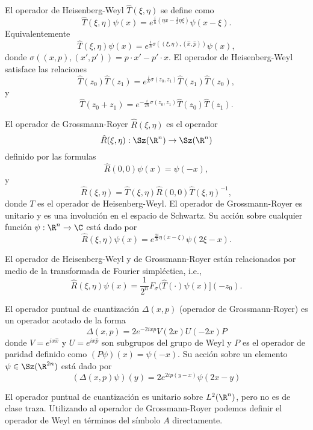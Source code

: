   \begin{definition}
    El operador de Heisenberg-Weyl $\hat{T}(\xi,\eta)$ se
    define como
    \[
      \hat{T}(\xi,\eta)\psi(x)
      = e^{\frac{i}{\hbar} (\eta x - \frac{1}{2} \eta
      \xi)}\psi(x - \xi).
    \] 
    Equivalentemente
    \[
      \hat{T}(\xi,\eta)\psi(x)
      = e^{\frac{i}{\hbar} \sigma((\xi,\eta),
      (\hat{x},\hat{p}))}\psi(x),
    \] 
    donde $\sigma((x,p),(x',p')) = p \cdot x' - p' \cdot x$.
    El operador de Heisenberg-Weyl satisface las relaciones
    \[
      \hat{T}(z_0)\hat{T}(z_1)
      = e^{\frac{i}{\hbar} \sigma(z_0,z_1)}
      \hat{T}(z_1)\hat{T}(z_0),
    \] 
    y
    \[
      \hat{T}(z_0+z_1)
      = e^{-\frac{i}{2\hbar} \sigma(z_0,z_1)}
      \hat{T}(z_0)\hat{T}(z_1).
    \] 
  \end{definition}
  \begin{definition}
    El operador de Grossmann-Royer $\hat{R}(\xi,\eta)$ es el
    operador
    \[
      \hat{R}(\xi,\eta) : \Sz(\R^{n}) \to \Sz(\R^{n})
    \] 
    definido por las formulas 
    \[
      \hat{R}(0,0)\psi(x)
      = \psi(-x),
    \]
    y
    \[
      \hat{R}(\xi,\eta)
      = \hat{T}(\xi,\eta) \hat{R}(0,0)
      \hat{T}(\xi,\eta)^{-1},
    \] 
    donde $T$ es el operador de Heisenberg-Weyl. El operador
    de Grossmann-Royer es unitario y es una involución en el
    espacio de Schwartz. Su acción sobre cualquier función
    $\psi : \R^{n} \to \C$ está dado por
    \[
      \hat{R}(\xi,\eta)\psi(x)
      = e^{\frac{2i}{\hbar} \eta (x - \xi)}\psi(2\xi - x).
    \] 
  \end{definition}
  El operador de Heisenberg-Weyl y de Grossmann-Royer están
  relacionados por medio de la transformada de Fourier
  simpléctica, i.e.,
  \[
    \hat{R}(\xi,\eta)\psi(x)
    = \frac{1}{2^{n}} F_\sigma(\hat{T}(\cdot)\psi(x)](-z_0).
  \] 
  \begin{definition}
    El operador puntual de cuantización $\Delta(x,p)$
    (operador de Grossmann-Royer) es un operador acotado de
    la forma
    \begin{equation}
      \label{eqn:point_operator}
      \Delta(x,p)
      = 2e^{-2i x p} V(2x)U(-2x) P
    \end{equation} 
    donde $V = e^{ix \hat{x}}$ y $U = e^{ix \hat{p}}$ son
    subgrupos del grupo de Weyl y $P$ es el operador de
    paridad definido como $(P\psi)(x) = \psi(-x)$.  Su
    acción sobre un elemento $\psi \in \Sz(\R^{2n})$ está
    dado por
    \begin{equation}
      \label{eqn:grossmann_royer_op}
      \left(\Delta(x,p)\psi\right)(y)
      = 2e^{2i p (y-x)}\psi(2x - y)
    \end{equation}
  \end{definition}
  El operador puntual de cuantización es unitario sobre
  $L^2(\R^{n})$, pero no es de clase traza. Utilizando al
  operador de Grossmann-Royer podemos definir el operador de
  Weyl en términos del símbolo $A$ directamente.
  
